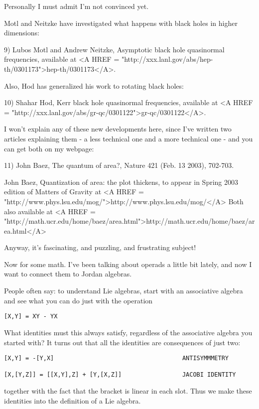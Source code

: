 Personally I must admit I'm not convinced yet.  

Motl and Neitzke have investigated what happens with black holes in
higher dimensions:

9) Lubos Motl and Andrew Neitzke, Asymptotic black hole quasinormal 
frequencies, available at <A HREF = "http://xxx.lanl.gov/abs/hep-th/0301173">hep-th/0301173</A>.

Also, Hod has generalized his work to rotating black holes:

10) Shahar Hod, Kerr black hole quasinormal frequencies, 
available at <A HREF = "http://xxx.lanl.gov/abs/gr-qc/0301122">gr-qc/0301122</A>.

I won't explain any of these new developments here, since I've written
two articles explaining them - a less technical one and a more technical
one - and you can get both on my webpage:

11) John Baez, The quantum of area?, Nature 421 (Feb. 13 2003), 702-703.
   
John Baez, Quantization of area: the plot thickens, to appear in 
Spring 2003 edition of Matters of Gravity at <A HREF = "http://www.phys.lsu.edu/mog/">http://www.phys.lsu.edu/mog/</A>
Both also available at <A HREF = "http://math.ucr.edu/home/baez/area.html">http://math.ucr.edu/home/baez/area.html</A>

Anyway, it's fascinating, and puzzling, and frustrating subject!

Now for some math.  I've been talking about operads a little
bit lately, and now I want to connect them to Jordan algebras.  

People often say: to understand Lie algebras, start with an associative
algebra and see what you can do just with the operation

\begin{verbatim}
[X,Y] = XY - YX 
\end{verbatim}
    
What identities must this always satisfy, regardless of the associative 
algebra you started with?  It turns out that all the identities are 
consequences of just two:

\begin{verbatim}
[X,Y] = -[Y,X]                                    ANTISYMMMETRY

[X,[Y,Z]] = [[X,Y],Z] + [Y,[X,Z]]                 JACOBI IDENTITY
\end{verbatim}
    
together with the fact that the bracket is linear in each slot.
Thus we make these identities into the definition of a Lie algebra.  

